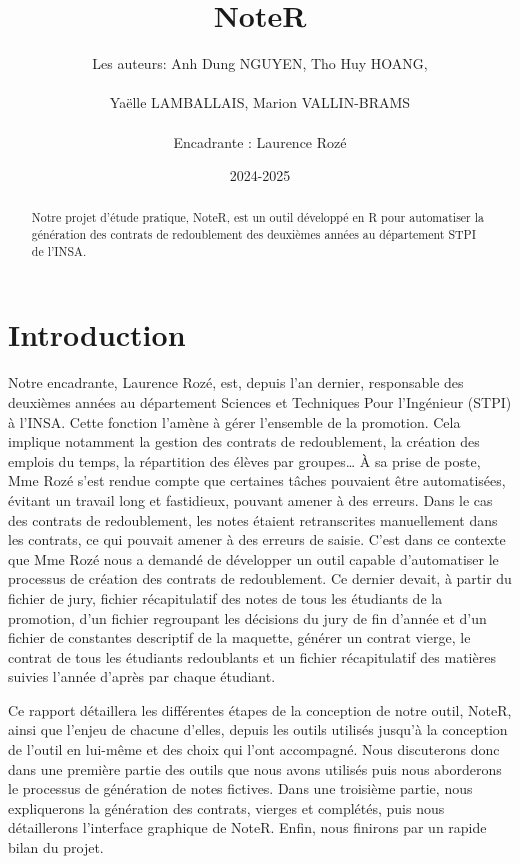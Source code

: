 \documentclass[a4paper,11pt]{article}
\title{\textbf{NoteR}}
\author{Les auteurs: Anh Dung NGUYEN, Tho Huy HOANG, 
\\ \\ Yaëlle LAMBALLAIS,  Marion VALLIN-BRAMS
	\\ \\
	Encadrante : Laurence Rozé}
\date{2024-2025}                    %
\begin{document}
  \maketitle %



\begin{abstract}
Notre projet d’étude pratique, NoteR, est un outil développé en R pour automatiser la génération des contrats de redoublement des deuxièmes années au département STPI de l’INSA. 
\end{abstract}

\tableofcontents


\section*{Introduction}
	Notre encadrante, Laurence Rozé, est, depuis l'an dernier, responsable des deuxièmes années au département Sciences et Techniques Pour l'Ingénieur (STPI) à l'INSA. Cette fonction l'amène à gérer l'ensemble de la promotion. Cela implique notamment la gestion des contrats de redoublement, la création des emplois du temps, la répartition des élèves par groupes… À sa prise de poste, Mme Rozé s'est rendue compte que certaines tâches pouvaient être automatisées, évitant un travail long et fastidieux, pouvant amener à des erreurs. Dans le cas des contrats de redoublement, les notes étaient retranscrites manuellement dans les contrats, ce qui pouvait amener à des erreurs de saisie. C'est dans ce contexte que Mme Rozé nous a demandé de développer un outil capable d'automatiser le processus de création des contrats de redoublement. Ce dernier devait, à partir du fichier de jury, fichier récapitulatif des notes de tous les étudiants de la promotion, d'un fichier regroupant les décisions du jury de fin d'année et d'un fichier de constantes descriptif de la maquette, générer un contrat vierge, le contrat de tous les étudiants redoublants et un fichier récapitulatif des matières suivies l'année d'après par chaque étudiant. 
    
    Ce rapport détaillera les différentes étapes de la conception de notre outil, NoteR, ainsi que l'enjeu de chacune d'elles, depuis les outils utilisés jusqu'à la conception de l'outil en lui-même et des choix qui l'ont accompagné. Nous discuterons donc dans une première partie des outils que nous avons utilisés puis nous aborderons le processus de génération de notes fictives. Dans une troisième partie, nous expliquerons la génération des contrats, vierges et complétés, puis nous détaillerons l'interface graphique de NoteR. Enfin, nous finirons par un rapide bilan du projet.
\end{document}
